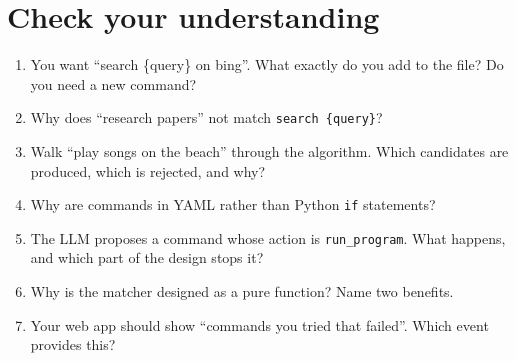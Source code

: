 \documentclass[11pt,a4paper]{article}
\begin{document}
\section{Check your understanding}
\begin{exercise}
\begin{enumerate}
  \item You want ``search \{query\} on bing''. What exactly do you add to the file? Do you need a
        new command?
  \item Why does ``research papers'' not match \texttt{search \{query\}}?
  \item Walk ``play songs on the beach'' through the algorithm. Which candidates are produced,
        which is rejected, and why?
  \item Why are commands in YAML rather than Python \texttt{if} statements?
  \item The LLM proposes a command whose action is \texttt{run\_program}. What happens, and
        which part of the design stops it?
  \item Why is the matcher designed as a pure function? Name two benefits.
  \item Your web app should show ``commands you tried that failed''. Which event provides this?
\end{enumerate}
\end{exercise}
\end{document}

